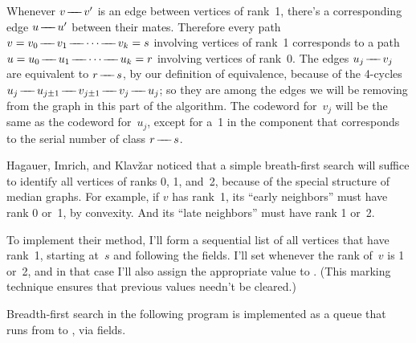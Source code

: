 Whenever $v\mathrel{\!\mathrel-\mkern-8mu\mathrel-\mkern-8mu\mathrel-\!} v'$ is an edge between vertices of rank~1, there's a
corresponding edge $u\mathrel{\!\mathrel-\mkern-8mu\mathrel-\mkern-8mu\mathrel-\!} u'$ between their mates. Therefore
every path $v=v_0\adj v_1\adj\cdots\adj v_k=s$ involving vertices
of rank~1 corresponds to a path $u=u_0\adj u_1\adj\cdots\adj u_k=r$
involving vertices of rank~0. The edges $u_j\mathrel{\!\mathrel-\mkern-8mu\mathrel-\mkern-8mu\mathrel-\!} v_j$ are
equivalent to $r\mathrel{\!\mathrel-\mkern-8mu\mathrel-\mkern-8mu\mathrel-\!} s$, by our definition of equivalence, because
of the 4-cycles $u_j\adj u_{j\pm1}\adj v_{j\pm1}\adj v_j\adj u_j$;
so they are among the edges we will be
removing from the graph in this part of the algorithm.
The codeword for~$v_j$ will be the same as the codeword for~$u_j$,
except for a~1 in the component that corresponds to the serial
number of class $r\mathrel{\!\mathrel-\mkern-8mu\mathrel-\mkern-8mu\mathrel-\!} s$.

Hagauer, Imrich, and Klav\v{z}ar noticed that a simple breath-first
search will suffice to identify all vertices of ranks 0, 1, and~2,
because of the special structure of median graphs. For example, if
$v$ has rank~1, its ``early neighbors'' must have rank 0 or~1, by
convexity. And its ``late neighbors'' must have rank 1 or~2.

To implement their method, I'll form a sequential list of all
vertices that have rank~1, starting at~$s$ and following the
 fields. I'll set  whenever the rank
of~$v$ is
1 or~2, and in that case I'll also assign the appropriate
value to . (This marking technique ensures that
previous  values needn't be cleared.)

Breadth-first search in the following program is implemented as
a queue that runs from  to , via  fields.

